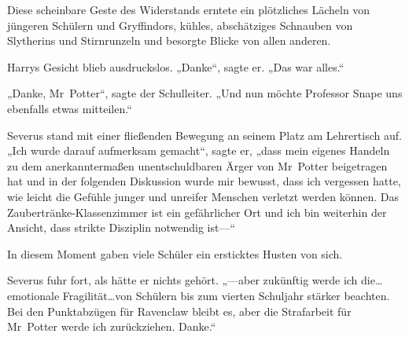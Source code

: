 Diese scheinbare Geste des Widerstands erntete ein plötzliches Lächeln von jüngeren Schülern und Gryffindors, kühles, abschätziges Schnauben von Slytherins und Stirnrunzeln und besorgte Blicke von allen anderen.

Harrys Gesicht blieb ausdruckslos. „Danke“, sagte er. „Das war alles.“

„Danke, Mr~Potter“, sagte der Schulleiter. „Und nun möchte Professor Snape uns ebenfalls etwas mitteilen.“

Severus stand mit einer fließenden Bewegung an seinem Platz am Lehrertisch auf. „Ich wurde darauf aufmerksam gemacht“, sagte er, „dass mein eigenes Handeln zu dem anerkanntermaßen unentschuldbaren Ärger von Mr~Potter beigetragen hat und in der folgenden Diskussion wurde mir bewusst, dass ich vergessen hatte, wie leicht die Gefühle junger und unreifer Menschen verletzt werden können. Das Zaubertränke-Klassenzimmer ist ein gefährlicher Ort und ich bin weiterhin der Ansicht, dass strikte Disziplin notwendig ist—“

In diesem Moment gaben viele Schüler ein ersticktes Husten von sich.

Severus fuhr fort, als hätte er nichts gehört. „—aber zukünftig werde ich die…emotionale Fragilität…von Schülern bis zum vierten Schuljahr stärker beachten. Bei den Punktabzügen für Ravenclaw bleibt es, aber die Strafarbeit für Mr~Potter werde ich zurückziehen. Danke.“

